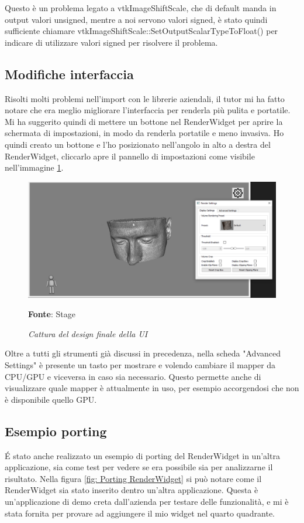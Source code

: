 Questo è un problema legato a vtkImageShiftScale, che di default manda in output valori unsigned, mentre a noi servono valori signed, è stato quindi sufficiente chiamare vtkImageShiftScale::SetOutputScalarTypeToFloat() per indicare di utilizzare valori signed per risolvere il problema.

\subsection{Modifiche interfaccia}
Risolti molti problemi nell'import con le librerie aziendali, il tutor mi ha fatto notare che era meglio migliorare l'interfaccia per renderla più pulita e portatile. Mi ha suggerito quindi di mettere un bottone nel RenderWidget per aprire la schermata di impostazioni, in modo da renderla portatile e meno invasiva. Ho quindi creato un bottone e l'ho posizionato nell'angolo in alto a destra del RenderWidget, cliccarlo apre il pannello di impostazioni come visibile nell'immagine \ref{fig: Final UI}.

\begin{figure}[h]
    \centering
    \includegraphics[width=1\textwidth]{immagini/svolgimento/finalnewui.png}
    \caption{\textit{Cattura del design finale della UI}}
    \textbf{Fonte}: Stage
    \label{fig: Final UI}
\end{figure}

Oltre a tutti gli strumenti già discussi in precedenza, nella scheda "Advanced Settings" è presente un tasto per mostrare e volendo cambiare il mapper da CPU/GPU e viceversa in caso sia necessario. Questo permette anche di visualizzare quale mapper è attualmente in uso, per esempio accorgendosi che non è disponibile quello GPU.

\subsection{Esempio porting}
\'E stato anche realizzato un esempio di porting del RenderWidget in un'altra applicazione, sia come test per vedere se era possibile sia per analizzarne il risultato. Nella figura \ref{fig: Porting RenderWidget} si può notare come il RenderWidget sia stato inserito dentro un'altra applicazione. Questa è un'applicazione di demo creta dall'azienda per testare delle funzionalità, e mi è stata fornita per provare ad aggiungere il mio widget nel quarto quadrante.

